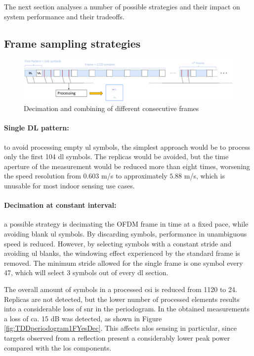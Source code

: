 			The next section analyses a number of possible strategies and their impact on system performance and their tradeoffs.    

	\subsection{Frame sampling strategies}

		    \begin{figure}[H]
		        \centering
		        \includegraphics[width=1\textwidth]{Images/TDDprocessing/TDDstrategies.eps}
		        \caption{Decimation and combining of different consecutive frames}
		        \label{fig:TDDstrategies}
		    \end{figure}
		
		    \paragraph{Single DL pattern:}
		    to avoid processing empty \gls{ul} symbols, the simplest approach would be to process only the first 104 \gls{dl} symbols. The replicas would be avoided, but the time aperture of the measurement would be reduced more than eight times, worsening the speed resolution from $0.603$ m/s to approximately $5.88$ m/s, which is unusable for most indoor sensing use cases.
		    
		    \paragraph{Decimation at constant interval:}
		     a possible strategy is decimating the OFDM frame in time at a fixed pace, while avoiding blank \gls{ul} symbols. 
		     By discarding symbols, performance in unambiguous speed is reduced. However, by selecting symbols with a constant stride and avoiding \gls{ul} blanks, the windowing effect experienced by the standard frame is removed.
		     The minimum stride allowed for the single frame is one symbol every 47, which will select 3 symbols out of every \gls{dl} section.
		     
		     The overall amount of symbols in a processed \gls{csi} is reduced from 1120 to 24.
		     Replicas are not detected, but the lower number of processed elements results into a considerable loss of \gls{snr} in the periodogram. In the obtained measurements a loss of ca. 15 dB was detected, as shown in Figure \ref{fig:TDDperiodogram1FYesDec}. 
		     This affects \gls{nlos} sensing in particular, since targets observed from a reflection present a considerably lower peak power compared with the \gls{los} components.
		
